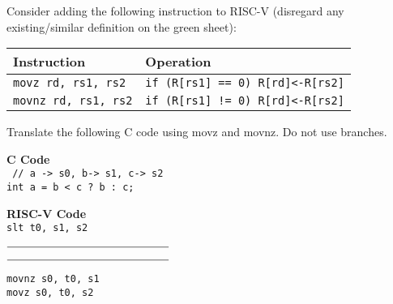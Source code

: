\begin{blocksection}
Consider adding the following instruction to RISC-V 
(disregard any existing/similar definition on the green sheet):

\begin{tabular}{ |l|l| } 
 \hline
 \textbf{Instruction} & \textbf{Operation} \\ 
 \hline
 \texttt{movz rd, rs1, rs2} & \texttt{if (R[rs1] == 0) R[rd]<-R[rs2]}  \\ 
 \hline
 \texttt{movnz rd, rs1, rs2} & \texttt{if (R[rs1] != 0) R[rd]<-R[rs2]} \\ 
 \hline
\end{tabular}


\question
Translate the following C code using movz and movnz. Do not use branches.

\textbf{C Code} \\
\texttt{
// a -> s0, b-> s1, c-> s2 \\
int a = b < c ? b : c;
}



\textbf{RISC-V Code} \\
\texttt{slt t0, s1, s2}


$\rule{5cm}{0.15mm}$


$\rule{5cm}{0.15mm}$

    
\begin{solution}[0.5in]
 \texttt{movnz s0, t0, s1} \\
 \texttt{movz s0, t0, s2}
\end{solution}

\end{blocksection}
